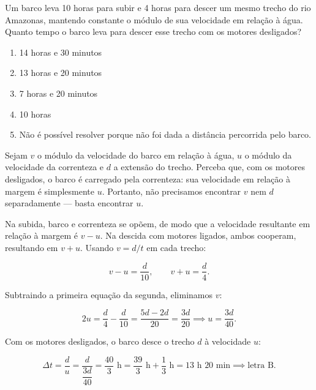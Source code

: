 \begin{exemplo}\label{exemplo_cinematica_vrelativa03}

Um barco leva 10 horas para subir e 4 horas para descer um mesmo trecho do rio Amazonas, mantendo constante o módulo de sua velocidade em relação à água. Quanto tempo o barco leva para descer esse trecho com os motores desligados?

\begin{enumerate}
    \item [a)] 14 horas e 30 minutos
    \item [b)] 13 horas e 20 minutos
    \item [c)] 7 horas e 20 minutos
    \item [d)] 10 horas
    \item [e)] Não é possível resolver porque não foi dada a distância percorrida pelo barco.
\end{enumerate}

\resolucao

Sejam $v$ o módulo da velocidade do barco em relação à água, $u$ o módulo da velocidade da correnteza e $d$ a extensão do trecho. Perceba que, com os motores desligados, o barco é carregado pela correnteza: sua velocidade em relação à margem é simplesmente $u$. Portanto, não precisamos encontrar $v$ nem $d$ separadamente — basta encontrar $u$.

Na subida, barco e correnteza se opõem, de modo que a velocidade resultante em relação à margem é $v - u$. Na descida com motores ligados, ambos cooperam, resultando em $v + u$. Usando $v=d/t$ em cada trecho:

$$v - u = \dfrac{d}{10}, \qquad v + u = \dfrac{d}{4}.$$

Subtraindo a primeira equação da segunda, eliminamos $v$:

$$2u = \dfrac{d}{4} - \dfrac{d}{10} = \dfrac{5d - 2d}{20} = \dfrac{3d}{20} \implies u = \dfrac{3d}{40}.$$

Com os motores desligados, o barco desce o trecho $d$ à velocidade $u$:

$$\Delta t = \dfrac{d}{u} = \dfrac{d}{\dfrac{3d}{40}} = \dfrac{40}{3} \text{ h} = \dfrac{39}{3} \text{ h} + \dfrac{1}{3} \text{ h}= 13\text{ h } 20\text{ min} \implies \text{letra B.}$$



\end{exemplo}

\vspace{0.3cm}



